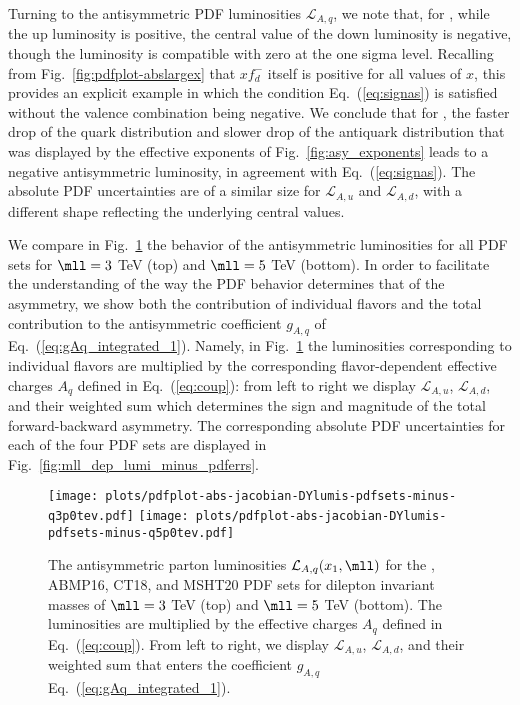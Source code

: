 Turning to the antisymmetric PDF luminosities $\mathcal{L}_{A,q}$,
we note  that, for , while the up luminosity is
positive, the central value of the down luminosity is negative, though
the luminosity is compatible with zero at the one sigma level.
%
Recalling
from Fig.~\ref{fig:pdfplot-abslargex} that $xf_{d}^-$ itself is
positive for all values of $x$,  this provides an explicit example in
which the condition Eq.~(\ref{eq:signas}) is satisfied without the valence
combination being negative.
%
We conclude that for , the faster
drop of the quark distribution and slower drop of the antiquark
distribution that was displayed by the effective exponents of
Fig.~\ref{fig:asy_exponents} leads to a negative antisymmetric
luminosity, in agreement with Eq.~(\ref{eq:signas}).
The absolute PDF uncertainties are of a similar size for
$\mathcal{L}_{A,u}$ and $\mathcal{L}_{A,d}$, with a different shape
reflecting the underlying central values.

We compare
in Fig.~\ref{fig:mll_dep_lumi_minus}
the behavior of the antisymmetric luminosities for all PDF
sets for $\mll=3$ TeV (top) and $\mll=5$ TeV (bottom).
%
In order to facilitate the understanding of the way the PDF behavior
determines that of the asymmetry, we show both the contribution of
individual flavors and the total contribution
to the antisymmetric coefficient $g_{A,q}$ of
Eq.~(\ref{eq:gAq_integrated_1}). Namely, in
Fig.~\ref{fig:mll_dep_lumi_minus} the luminosities corresponding to
individual flavors are multiplied by the corresponding flavor-dependent
effective charges $A_q$ defined in Eq.~(\ref{eq:coup}):
from left to right we display $\mathcal{L}_{A,u}$,  $\mathcal{L}_{A,d}$,
and their weighted sum
 which determines
the sign and magnitude of the total forward-backward asymmetry.
%
The corresponding absolute PDF uncertainties for each of the four PDF sets
are displayed in  Fig.~\ref{fig:mll_dep_lumi_minus_pdferrs}.

\begin{figure}[!t]
 \centering
 \texttt{[image: plots/pdfplot-abs-jacobian-DYlumis-pdfsets-minus-q3p0tev.pdf]}
 \texttt{[image: plots/pdfplot-abs-jacobian-DYlumis-pdfsets-minus-q5p0tev.pdf]}
 \caption{The antisymmetric 
   parton luminosities $\mathcal{L}_{A,q}(x_1,\mll)$ for the , ABMP16,
   CT18, and MSHT20 \nnlo PDF sets for dilepton
   invariant masses of
   $\mll=3$ TeV (top) and $\mll=5$ TeV (bottom).
   The luminosities are multiplied by the effective charges
   $A_q$ defined in Eq.~(\ref{eq:coup}).
   From left to right, we display $\mathcal{L}_{A,u}$,  $\mathcal{L}_{A,d}$,
   and their weighted sum that enters the  coefficient $g_{A,q}$ Eq.~(\ref{eq:gAq_integrated_1}).
    }    
 \label{fig:mll_dep_lumi_minus}
\end{figure}

